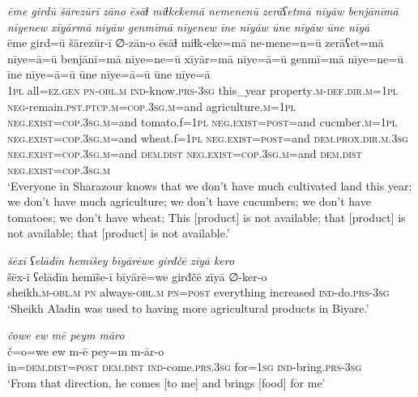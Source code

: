 \ea \label{PM.37}
\textit{ēme girdū šārezūrī zāno ēsāɫ miɫkekemā nemenenū zerāʕetmā nīyāw benjānīmā nīyenew xīyārmā nīyāw genmīmā nīyenew īne nīyāw ūne nīyāw ūne nīyā} \\ 
\gll ēme gird=ū šārezūr-ī ∅-zān-o ēsāɫ miɫk-eke=mā ne-mene=n=ū zerāʕet=mā nīye=ā=ū benjānī=mā nīye=ne=ū xīyār=mā nīye=ā=ū genmī=mā nīye=ne=ū īne nīye=ā=ū ūne nīye=ā=ū ūne nīye=ā \\ 
 \textsc{1pl} all\textsc{\textsc{=ez.gen}} \textsc{pn}\textsc{-obl}\textsc{.m} \textsc{ind-}know\textsc{.prs}\textsc{-3sg} this\_year property\textsc{.m}\textsc{-def}\textsc{.dir}\textsc{.m}\textsc{=1pl} \textsc{neg-}remain\textsc{.pst}\textsc{.ptcp}\textsc{.m}\textsc{=cop}\textsc{.3sg}\textsc{.m}=and agriculture\textsc{.m}\textsc{=1pl} \textsc{\textsc{neg.}exist}\textsc{=cop}\textsc{.3sg}\textsc{.m}=and tomato.f\textsc{=1pl} \textsc{\textsc{neg.}exist}\textsc{=\textsc{post}}=and cucmber\textsc{.m}\textsc{=1pl} \textsc{\textsc{neg.}exist}\textsc{=cop}\textsc{.3sg}\textsc{.m}=and wheat.f\textsc{=1pl} \textsc{\textsc{neg.}exist}\textsc{=\textsc{post}}=and \textsc{dem.prox}\textsc{.dir}\textsc{.m}\textsc{.3sg} \textsc{\textsc{neg.}exist}\textsc{=cop}\textsc{.3sg}\textsc{.m}=and \textsc{dem.dist} \textsc{\textsc{neg.}exist}\textsc{=cop}\textsc{.3sg}\textsc{.m}=and \textsc{dem.dist} \textsc{\textsc{neg.}exist}\textsc{=cop}\textsc{.3sg}\textsc{.m} \\ 
\glt `Everyone in Sharazour knows that we don’t have much cultivated land this year; we don’t have much agriculture; we don’t have cucumbers; we don’t have tomatoes; we don’t have wheat; This [product] is not available; that [product] is not available; that [product] is not available.'
\z 
 
\ea \label{PM.42}
\textit{šēxī ʕelādīn hemīšey bīyārēwe girđčē zīyā kero} \\ 
\gll šēx-ī ʕelādīn hemīše-ī bīyārē=we girđčē zīyā ∅-ker-o \\ 
 sheikh\textsc{.m}\textsc{-obl}\textsc{.m} \textsc{pn} always\textsc{-obl}\textsc{.m} \textsc{pn}\textsc{=\textsc{post}} everything increased \textsc{ind-}do\textsc{.prs}\textsc{-3sg} \\ 
\glt `Sheikh Aladin was used to having more agricultural products in Biyare.'
\z 
 
\ea \label{PM.46}
\textit{čowe ew mē peym māro} \\ 
\gll č=o=we ew m-ē pey=m m-ār-o \\ 
 in=\textsc{dem.dist}\textsc{=\textsc{post}} \textsc{dem.dist} \textsc{ind-}come\textsc{.prs}\textsc{.3sg} for\textsc{=\textsc{1sg}} \textsc{ind-}bring\textsc{.prs}\textsc{-3sg} \\ 
\glt `From that direction, he  comes [to me] and brings [food] for me'
\z 
 
